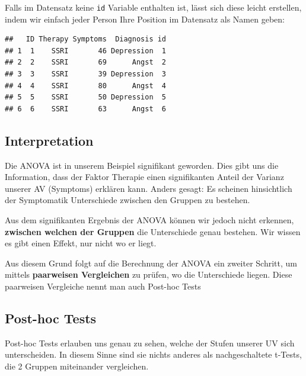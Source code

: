 \documentclass[
]{book}
\newenvironment{Shaded}{\begin{snugshade}}{\end{snugshade}}
\newcommand{\FunctionTok}[1]{\textcolor[rgb]{0.00,0.00,0.00}{#1}}
\newcommand{\NormalTok}[1]{#1}
\newcommand{\OtherTok}[1]{\textcolor[rgb]{0.56,0.35,0.01}{#1}}
\newcommand{\SpecialCharTok}[1]{\textcolor[rgb]{0.00,0.00,0.00}{#1}}
\begin{document}
Falls im Datensatz keine \texttt{id} Variable enthalten ist, lässt sich diese leicht erstellen, indem wir einfach jeder Person Ihre Position im Datensatz als Namen geben:

\begin{Shaded}
\end{Shaded}

\begin{verbatim}
##   ID Therapy Symptoms  Diagnosis id
## 1  1    SSRI       46 Depression  1
## 2  2    SSRI       69      Angst  2
## 3  3    SSRI       39 Depression  3
## 4  4    SSRI       80      Angst  4
## 5  5    SSRI       50 Depression  5
## 6  6    SSRI       63      Angst  6
\end{verbatim}

\hypertarget{interpretation}{%
\subsection{Interpretation}\label{interpretation}}

Die ANOVA ist in unserem Beispiel signifikant geworden. Dies gibt uns die Information, dass der Faktor Therapie einen signifikanten Anteil der Varianz unserer AV (Symptoms) erklären kann. Anders gesagt: Es scheinen hinsichtlich der Symptomatik Unterschiede zwischen den Gruppen zu bestehen.

Aus dem signifikanten Ergebnis der ANOVA können wir jedoch nicht erkennen, \textbf{zwischen welchen der Gruppen} die Unterschiede genau bestehen. Wir wissen es gibt einen Effekt, nur nicht wo er liegt.

Aus diesem Grund folgt auf die Berechnung der ANOVA ein zweiter Schritt, um mittels \textbf{paarweisen Vergleichen} zu prüfen, wo die Unterschiede liegen. Diese paarweisen Vergleiche nennt man auch Post-hoc Tests

\hypertarget{post-hoc-tests}{%
\subsection{Post-hoc Tests}\label{post-hoc-tests}}

Post-hoc Tests erlauben uns genau zu sehen, welche der Stufen unserer UV sich unterscheiden. In diesem Sinne sind sie nichts anderes als nachgeschaltete t-Tests, die 2 Gruppen miteinander vergleichen.
\end{document}
